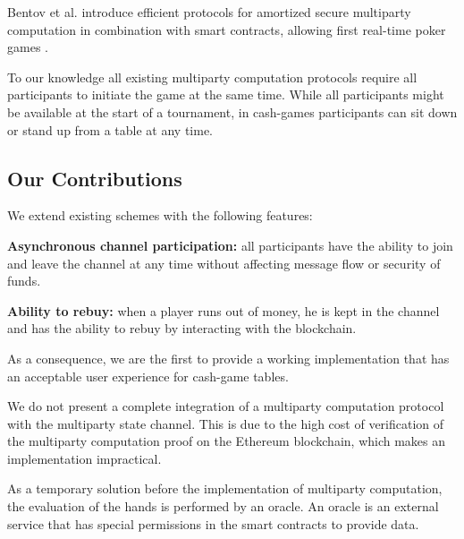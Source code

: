Bentov et al. introduce efficient protocols for amortized secure multiparty computation in combination with smart contracts, allowing first real-time poker games \cite{bentov17}.

To our knowledge all existing multiparty computation protocols require all participants to initiate the game at the same time. While all participants might be available at the start of a tournament, in cash-games participants can sit down or stand up from a table at any time.

\subsection{Our Contributions}

We extend existing schemes with the following features:
 
\textbf{Asynchronous channel participation:} all participants have the ability to join and leave the channel at any time without affecting message flow or security of funds.
 
\textbf{Ability to rebuy:} when a player runs out of money, he is kept in the channel and has the ability to rebuy by interacting with the blockchain.

As a consequence, we are the first to provide a working implementation that has an acceptable user experience for cash-game tables.

We do not present a complete integration of a multiparty computation protocol with the multiparty state channel. This is due to the high cost of verification \cite{bentov17} of the multiparty computation proof on the Ethereum blockchain, which makes an implementation impractical.

As a temporary solution before the implementation of multiparty computation, the evaluation of the hands is performed by an oracle. An oracle is an external service that has special permissions in the smart contracts to provide data.
